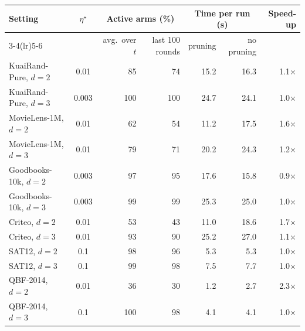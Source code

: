 \begin{tabular}{lcrrrrr}
\toprule
Setting & $\eta^\star$ & \multicolumn{2}{c}{Active arms (\%)} & \multicolumn{2}{c}{Time per run (s)} & Speed-up\\
\cmidrule(lr){3-4}\cmidrule(lr){5-6}
 & & avg.\ over $t$ & last 100 rounds & pruning & no pruning & \\
\midrule
KuaiRand-Pure, $d=2$ & 0.01 & 85 & 74 & 15.2 & 16.3 & 1.1$\times$\\
KuaiRand-Pure, $d=3$ & 0.003 & 100 & 100 & 24.7 & 24.1 & 1.0$\times$\\
MovieLens-1M, $d=2$ & 0.01 & 62 & 54 & 11.2 & 17.5 & 1.6$\times$\\
MovieLens-1M, $d=3$ & 0.01 & 79 & 71 & 20.2 & 24.3 & 1.2$\times$\\
Goodbooks-10k, $d=2$ & 0.003 & 97 & 95 & 17.6 & 15.8 & 0.9$\times$\\
Goodbooks-10k, $d=3$ & 0.003 & 99 & 99 & 25.3 & 25.0 & 1.0$\times$\\
Criteo, $d=2$ & 0.01 & 53 & 43 & 11.0 & 18.6 & 1.7$\times$\\
Criteo, $d=3$ & 0.01 & 93 & 90 & 25.2 & 27.0 & 1.1$\times$\\
SAT12, $d=2$ & 0.1 & 98 & 96 & 5.3 & 5.3 & 1.0$\times$\\
SAT12, $d=3$ & 0.1 & 99 & 98 & 7.5 & 7.7 & 1.0$\times$\\
QBF-2014, $d=2$ & 0.01 & 36 & 30 & 1.2 & 2.7 & 2.3$\times$\\
QBF-2014, $d=3$ & 0.1 & 100 & 98 & 4.1 & 4.1 & 1.0$\times$\\
\bottomrule
\end{tabular}
